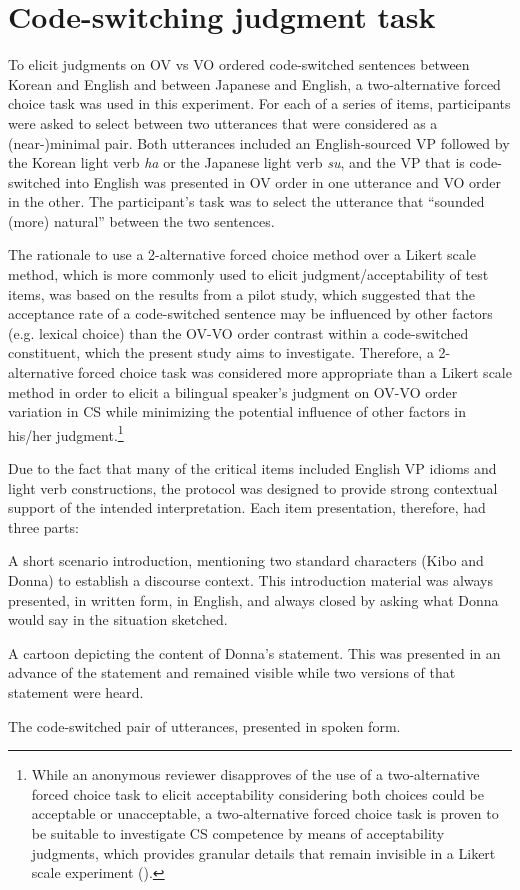 \section{Code-switching judgment task}\label{ch2:sect:2.1}

To elicit judgments on \ac{OV} vs \ac{VO} ordered code-switched sentences between Korean and English and between Japanese and English, a two-alternative forced choice task was used in this experiment. For each of a series of items, participants were asked to select between two utterances that were considered as a (near-)minimal pair.\textsuperscript{} Both utterances included an English-sourced \ac{VP} followed by the Korean light verb \textit{ha} or the Japanese light verb \textit{su}, and the \ac{VP} that is code-switched into English was presented in \ac{OV} order in one utterance and \ac{VO} order in the other. The participant’s task was to select the utterance that “sounded (more) natural” between the two sentences.

The rationale to use a 2-alternative forced choice method over a Likert scale method, which is more commonly used to elicit judgment/acceptability of test items, was based on the results from a pilot study, which suggested that the acceptance rate of a code-switched sentence may be influenced by other factors (e.g. lexical choice) than the \ac{OV}-\ac{VO} order contrast within a code-switched constituent, which the present study aims to investigate. Therefore, a 2-alternative forced choice task was considered more appropriate than a Likert scale method in order to elicit a bilingual speaker’s judgment on \ac{OV}-\ac{VO} order variation in \ac{CS} while minimizing the potential influence of other factors in his/her judgment.\footnote{\textrm{While an anonymous reviewer disapproves of the use of a two-alternative forced choice task to elicit acceptability considering both choices could be acceptable or unacceptable, a two-alternative forced choice task is proven to be suitable to investigate \ac{CS} competence by means of acceptability judgments, which provides granular details that remain invisible in a Likert scale experiment (\citealt{Stadthagenetal2018}).}} 

Due to the fact that many of the critical items included English \ac{VP} idioms and light verb constructions, the protocol was designed to provide strong contextual support of the intended interpretation. Each item presentation, therefore, had three parts:

\begin{exe}
 A short scenario introduction, mentioning two standard characters (Kibo and Donna) to establish a discourse context. This introduction material was always presented, in written form, in English, and always closed by asking what Donna would say in the situation sketched.

 A cartoon depicting the content of Donna’s statement. This was presented in an advance of the statement and remained visible while two versions of that statement were heard.

The code-switched pair of utterances, presented in spoken form.
\end{exe}

